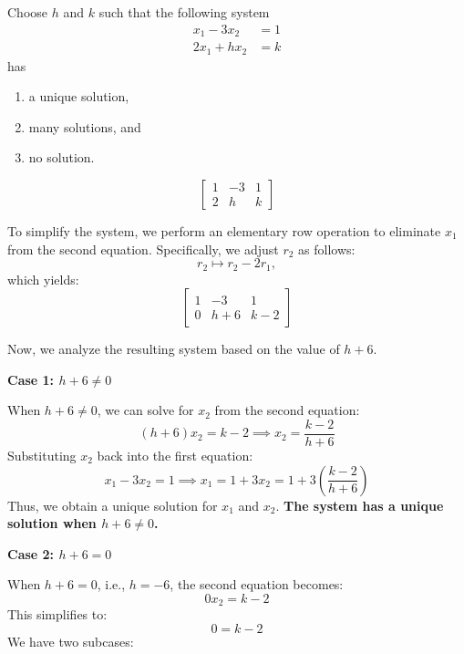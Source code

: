 \begin{example}
    \label{ex:unique-solution}
    Choose $h$ and $k$ such that the following system
    \[
    \begin{aligned}
    x_1-3 x_2 & =1 \\
    2 x_1+h x_2 & =k
    \end{aligned}
    \]
    has
\begin{enumerate}[label=(\roman*)]
    \item a unique solution,
    \item many solutions, and
    \item no solution.
\end{enumerate}

\begin{solution}
        \[
        \left[\begin{array}{ccc}
        1 & -3 & 1 \\
        2 & h & k
        \end{array}\right]
        \]
        
        To simplify the system, we perform an elementary row operation to eliminate $x_1$ from the second equation. Specifically, we adjust $r_2$ as follows:
        \[
        r_2 \mapsto r_2 - 2r_1,
        \]
        which yields:
        \[
        \left[\begin{array}{ccc}
        1 & -3 & 1 \\
        0 & h + 6 & k - 2
        \end{array}\right]
        \]
        
        Now, we analyze the resulting system based on the value of $h + 6$.
        
        \textbf{Case 1: $h + 6 \ne 0$}
        
        When $h + 6 \ne 0$, we can solve for $x_2$ from the second equation:
        \[
        (h + 6)x_2 = k - 2 \implies x_2 = \dfrac{k - 2}{h + 6}
        \]
        Substituting $x_2$ back into the first equation:
        \[
        x_1 - 3x_2 = 1 \implies x_1 = 1 + 3x_2 = 1 + 3\left(\dfrac{k - 2}{h + 6}\right)
        \]
        Thus, we obtain a unique solution for $x_1$ and $x_2$. \textbf{The system has a unique solution when $h + 6 \ne 0$.}
        
        \newpage

        \textbf{Case 2: $h + 6 = 0$}
        
        When $h + 6 = 0$, i.e., $h = -6$, the second equation becomes:
        \[
        0x_2 = k - 2
        \]
        This simplifies to:
        \[
        0 = k - 2
        \]
        We have two subcases:
        

\end{solution}
\end{example}
